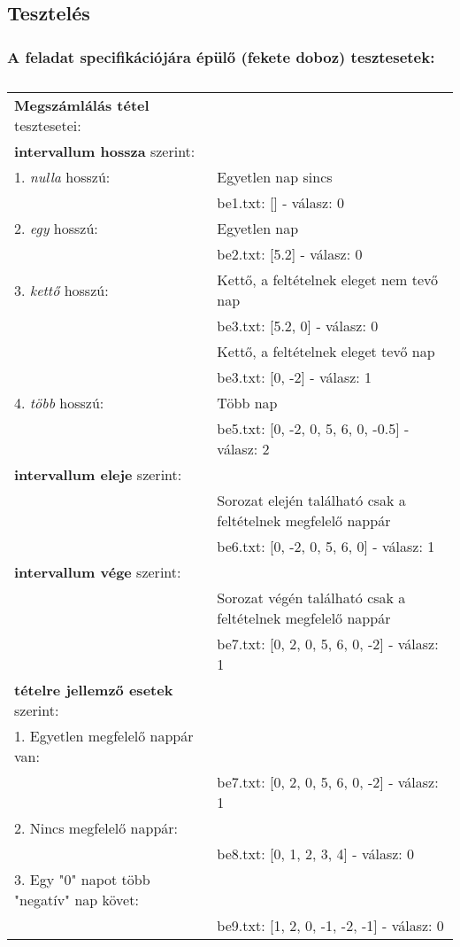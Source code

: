 \documentclass[a4paper]{article}
\begin{document}
    \subsection{Tesztelés}
      \subsubsection{A feladat specifikációjára épülő (fekete doboz) tesztesetek:}
      \begin{table}[H]
        \caption*{}
        \begin{tabular*}{\textwidth}{ll}
          \toprule
          \textbf{Megszámlálás tétel} tesztesetei: & \\
          \textbf{intervallum hossza} szerint: & \\
          1. \textit{nulla} hosszú: & Egyetlen nap sincs \\
          & \quad be1.txt: [] - válasz: 0 \\
          2. \textit{egy} hosszú: & Egyetlen nap \\
          & \quad be2.txt: [5.2] - válasz: 0 \\
          3. \textit{kettő} hosszú: & Kettő, a feltételnek eleget nem tevő nap \\
          & \quad be3.txt: [5.2, 0] - válasz: 0 \\
          & Kettő, a feltételnek eleget tevő nap \\
          & \quad be3.txt: [0, -2] - válasz: 1 \\
          4. \textit{több} hosszú: & Több nap \\
          & \quad be5.txt: [0, -2, 0, 5, 6, 0, -0.5] - válasz: 2 \\
          \textbf{intervallum eleje} szerint: & \\
          & Sorozat elején található csak a feltételnek megfelelő nappár \\
          & \quad be6.txt: [0, -2, 0, 5, 6, 0] - válasz: 1 \\
          \textbf{intervallum vége} szerint: & \\
          & Sorozat végén található csak a feltételnek megfelelő nappár \\
          & \quad be7.txt: [0, 2, 0, 5, 6, 0, -2] - válasz: 1 \\
          \textbf{tételre jellemző esetek} szerint: & \\
          1. Egyetlen megfelelő nappár van: & \\
          & \quad be7.txt: [0, 2, 0, 5, 6, 0, -2] - válasz: 1 \\
          2. Nincs megfelelő nappár: & \\
          & \quad be8.txt: [0, 1, 2, 3, 4] - válasz: 0 \\
          3. Egy "0" napot több "negatív" nap követ: & \\
          & \quad be9.txt: [1, 2, 0, -1, -2, -1] - válasz: 0 \\
          \bottomrule
        \end{tabular*}
      \end{table}
\end{document}

